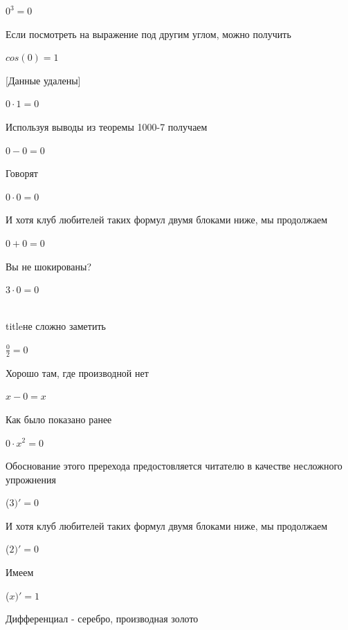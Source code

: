 \documentclass[12pt,a4paper,fleqn]{article}
\begin{document}
\begin{center}$0^{3} = 0$\end{center}
Если посмотреть на выражение под другим углом, можно получить

\begin{center}$cos(0) = 1$\end{center}
[Данные удалены]

\begin{center}$0 \cdot 1 = 0$\end{center}
Используя выводы из теоремы 1000-7 получаем

\begin{center}$0-0 = 0$\end{center}
Говорят

\begin{center}$0 \cdot 0 = 0$\end{center}
И хотя клуб любителей таких формул двумя блоками ниже, мы продолжаем

\begin{center}$0+0 = 0$\end{center}
Вы не шокированы?\cite{link3}

\begin{center}$3 \cdot 0 = 0$\end{center}
\\ title{не сложно заметить} 

\begin{center}$\frac{0}{2} = 0$\end{center}
Хорошо там, где производной нет\cite{link2}

\begin{center}
$x-0 = x$\end{center}
Как было показано ранее

\begin{center}
$0 \cdot x^{2} = 0$\end{center}
Обоснование этого пререхода предостовляется читателю в качестве несложного упрожнения

\begin{center}
 ($3)'
  = 0$\end{center}
И хотя клуб любителей таких формул двумя блоками ниже, мы продолжаем

\begin{center}
 ($2)'
  = 0$\end{center}
Имеем

\begin{center}
 ($x)'
  = 1$\end{center}
Дифференциал - серебро, производная золото\cite{link2}
\end{document}
